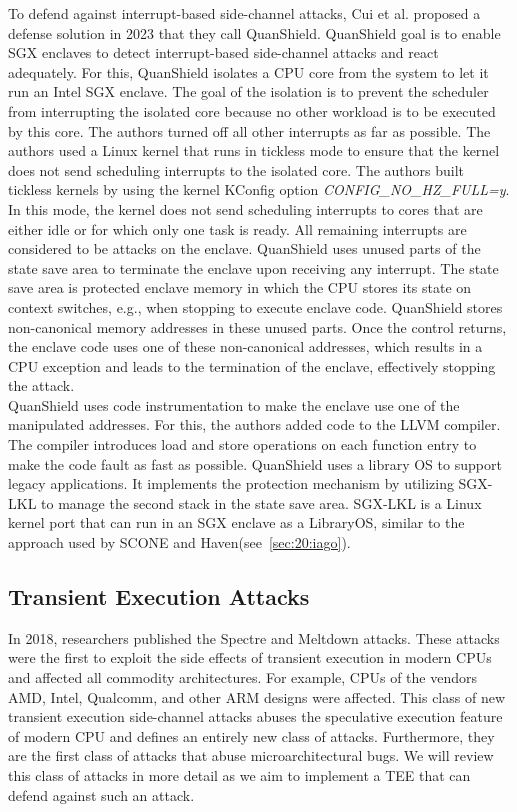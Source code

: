 To defend against interrupt-based side-channel attacks, Cui et al. proposed a
defense solution in 2023 that they call QuanShield.\cite{cui_quanshield_2023}
QuanShield goal is to enable SGX enclaves to detect interrupt-based side-channel
attacks and react adequately. For this, QuanShield isolates a CPU core from the
system to let it run an Intel SGX enclave. The goal of the isolation is to
prevent the scheduler from interrupting the isolated core because no other
workload is to be executed by this core. The authors turned off all other
interrupts as far as possible. The authors used a Linux kernel that runs in
tickless mode to ensure that the kernel does not send scheduling interrupts to
the isolated core. The authors built tickless kernels by using the kernel
KConfig option \textit{CONFIG\_NO\_HZ\_FULL=y}. In this mode, the kernel does
not send scheduling interrupts to cores that are either idle or for which only
one task is ready.\cite{linuxtickless} All remaining interrupts are considered
to be attacks on the enclave. QuanShield uses unused parts of the state save
area to terminate the enclave upon receiving any interrupt. The state save area
is protected enclave memory in which the CPU stores its state on context
switches, e.g., when stopping to execute enclave code. QuanShield stores
non-canonical memory addresses in these unused parts. Once the control returns,
the enclave code uses one of these non-canonical addresses, which results in a
CPU exception and leads to the termination of the enclave, effectively stopping
the attack.\\

QuanShield uses code instrumentation to make the enclave use one of the
manipulated addresses. For this, the authors added code to the LLVM compiler.
The compiler introduces load and store operations on each function entry to make
the code fault as fast as possible. QuanShield uses a library OS to support
legacy applications. It implements the protection mechanism by utilizing SGX-LKL
to manage the second stack in the state save area. SGX-LKL is a Linux kernel
port that can run in an SGX enclave as a LibraryOS, similar to the approach used
by SCONE and Haven(see~\ref{sec:20:iago}).\cite{priebe2019sgx}

\subsection{Transient Execution Attacks}
\label{sec:20:transientattacks}
In 2018, researchers published the Spectre and Meltdown
attacks.\cite{kocher_spectre_2020, lipp_meltdown_2020} These attacks were the
first to exploit the side effects of transient execution in modern CPUs and
affected all commodity architectures. For example, CPUs of the vendors AMD,
Intel, Qualcomm, and other ARM designs were affected. This class of new
transient execution side-channel attacks abuses the speculative execution
feature of modern CPU and defines an entirely new class of attacks. Furthermore,
they are the first class of attacks that abuse microarchitectural bugs. We will
review this class of attacks in more detail as we aim to implement a TEE that
can defend against such an attack.\\

